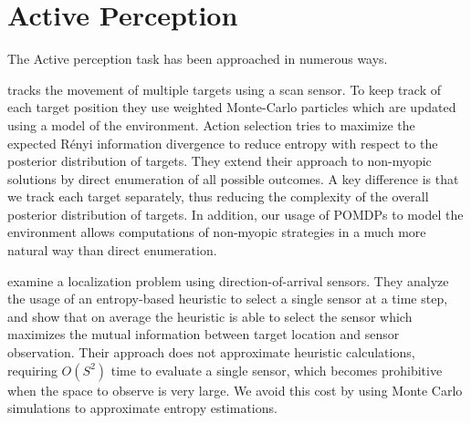 \section{Active Perception}

The Active perception task has been approached in numerous ways.

%

%

%

\cite{cit:relworktanks} tracks the movement of multiple targets using a scan sensor. To keep track
of each target position they use weighted Monte-Carlo particles which are updated using a model of
the environment. Action selection tries to maximize the expected Rényi information divergence to
reduce entropy with respect to the posterior distribution of targets. They extend their approach to
non-myopic solutions by direct enumeration of all possible outcomes. A key difference is that we
track each target separately, thus reducing the complexity of the overall posterior distribution of
targets. In addition, our usage of POMDPs to model the environment allows computations of non-myopic
strategies in a much more natural way than direct enumeration.

\cite{cit:relworkentropy} examine a localization problem using direction-of-arrival sensors. They
analyze the usage of an entropy-based heuristic to select a single sensor at a time step, and show
that on average the heuristic is able to select the sensor which maximizes the mutual information
between target location and sensor observation. Their approach does not approximate heuristic
calculations, requiring $O(S^2)$ time to evaluate a single sensor, which becomes prohibitive when
the space to observe is very large. We avoid this cost by using Monte Carlo simulations to
approximate entropy estimations.

